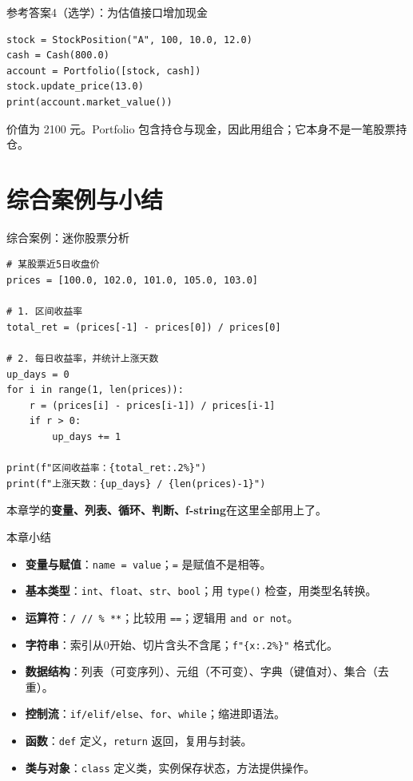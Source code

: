 \documentclass[9pt]{ctexbeamer}
\begin{document}
\begin{frame}[fragile]{参考答案4（选学）：为估值接口增加现金}
\begin{lstlisting}
stock = StockPosition("A", 100, 10.0, 12.0)
cash = Cash(800.0)
account = Portfolio([stock, cash])
stock.update_price(13.0)
print(account.market_value())
\end{lstlisting}
\small 价值为 2100 元。Portfolio 包含持仓与现金，因此用组合；它本身不是一笔股票持仓。
\end{frame}

\section{综合案例与小结}

\begin{frame}[fragile]{综合案例：迷你股票分析}
	\begin{lstlisting}
# 某股票近5日收盘价
prices = [100.0, 102.0, 101.0, 105.0, 103.0]

# 1. 区间收益率
total_ret = (prices[-1] - prices[0]) / prices[0]

# 2. 每日收益率，并统计上涨天数
up_days = 0
for i in range(1, len(prices)):
    r = (prices[i] - prices[i-1]) / prices[i-1]
    if r > 0:
        up_days += 1

print(f"区间收益率：{total_ret:.2%}")
print(f"上涨天数：{up_days} / {len(prices)-1}")
\end{lstlisting}
	\begin{center}
		本章学的\textbf{变量、列表、循环、判断、f-string}在这里全部用上了。
	\end{center}
\end{frame}

\begin{frame}{本章小结}
	\begin{itemize}
		\item \textbf{变量与赋值}：\texttt{name = value}；\texttt{=} 是赋值不是相等。
		\item \textbf{基本类型}：\texttt{int}、\texttt{float}、\texttt{str}、\texttt{bool}；用 \texttt{type()} 检查，用类型名转换。
		\item \textbf{运算符}：\texttt{/ // \% **}；比较用 \texttt{==}；逻辑用 \texttt{and or not}。
		\item \textbf{字符串}：索引从0开始、切片含头不含尾；\texttt{f"\{x:.2\%\}"} 格式化。
		\item \textbf{数据结构}：列表（可变序列）、元组（不可变）、字典（键值对）、集合（去重）。
		\item \textbf{控制流}：\texttt{if/elif/else}、\texttt{for}、\texttt{while}；\alert{缩进即语法}。
		\item \textbf{函数}：\texttt{def} 定义，\texttt{return} 返回，复用与封装。
		\item \textbf{类与对象}：\texttt{class} 定义类，实例保存状态，方法提供操作。
	\end{itemize}
\end{frame}
\end{document}
